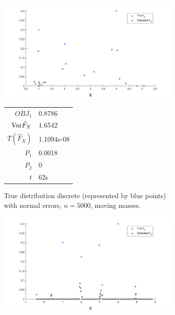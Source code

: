 \begin{figure}
	\centering
	\begin{subfigure}[b]{0.38\textwidth}
		\centering
		\includegraphics[width = \textwidth]{Figures/Deconvolution/moving_masses_discrete_n5000_example.png}
		\begin{tabular}{r l}
			$OBJ_1$ & 0.8786\\
			$\mathrm{Var} \hat{F}_X$ & 1.6542\\
			$T(\hat{F}_X)$ & 1.1094e-08\\
			$P_1$ & 0.0018\\
			$P_2$ & 0\\
			$t$ & 62s
		\end{tabular}
		\caption{True distribution discrete (represented by blue points) with normal errors, $n = 5000$, moving masses.}
		\label{fig:moving masses discrete}
	\end{subfigure}
	\hfill
	\begin{subfigure}[b]{0.38\textwidth}
		\centering
		\includegraphics[width = \textwidth]{Figures/Deconvolution/fixed_masses_discrete_n5000_example.png}
		\begin{tabular}{r l}

\end{tabular}
\end{subfigure}
\end{figure}
